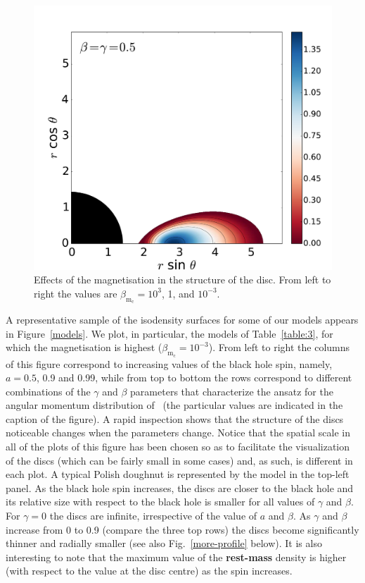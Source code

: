 \documentclass[]{aa}
\begin{document}
\begin{figure}[t]
\includegraphics[scale=0.14]{figures/fig3c.pdf}
\caption{Effects of the magnetisation in the structure of the disc. From left to right the values are $\beta_{\mathrm{m}_{\mathrm{c}}}
=10^3$, 1, and $10^{-3}$.}
\label{magnetisation}%
\end{figure}

A representative sample of the isodensity surfaces for some of our models appears in Figure~\ref{models}. We plot, in particular, the models of Table~\ref{table:3}, for which the magnetisation is highest ($\beta_{\mathrm{m}_{\mathrm{c}}}=10^{-3}$). From left to right the columns of this figure correspond to increasing values of the black hole spin, namely, $a=0.5$, 0.9 and 0.99, while from top to bottom the rows correspond to different combinations of the $\gamma$ and $\beta$ parameters that characterize the ansatz for the angular momentum distribution of~\citet{Qian:2009} (the particular values are indicated in the caption of the figure).  A rapid inspection shows that the structure of the discs noticeable changes when the parameters change. Notice that the spatial scale in all of the plots of this figure has been chosen so as to facilitate the visualization of the discs (which can be fairly small in some cases) and, as such, is different in each plot. A typical Polish doughnut is represented by the model in the top-left panel. As the black hole spin increases, the discs are closer to the black hole and its relative size with respect to the black hole is smaller for all values of $\gamma$ and $\beta$. For $\gamma=0$ the discs are infinite, irrespective of the value of $a$ and $\beta$. As $\gamma$ and $\beta$ increase from 0 to 0.9 (compare the three top rows) the discs become significantly thinner and radially smaller (see also Fig.~\ref{more-profile} below). It is also interesting to note that the maximum value of the {\bf rest-mass} density is higher (with respect to the value at the disc centre) as the spin increases.
\end{document}
